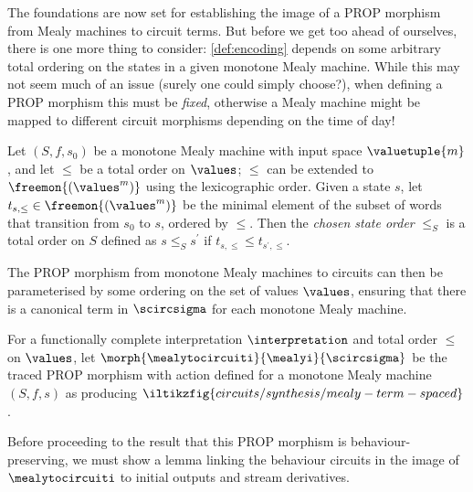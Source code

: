 The foundations are now set for establishing the image of a PROP morphism from
Mealy machines to circuit terms.
But before we get too ahead of ourselves, there is one more thing to consider:
\cref{def:encoding} depends on some arbitrary total ordering on the states in a
given monotone Mealy machine.
While this may not seem much of an issue (surely one could simply choose?), when
defining a PROP morphism this must be \emph{fixed}, otherwise a Mealy machine
might be mapped to different circuit morphisms depending on the time of day!

\begin{definition}
    Let \((S, f, s_0)\) be a monotone Mealy machine with input space
    \(\valuetuple{m}\), and let \(\leq\) be a total order on \(\values\);
    \(\leq\) can be extended to \(\freemon{(\values^m)}\) using the
    lexicographic order.
    Given a state \(s\), let \(t_{s,\leq} \in \freemon{(\values^m)}\) be
    the minimal element of the subset of words that transition from \(s_0\) to
    \(s\), ordered by \(\leq\).
    Then the \emph{chosen state order} \(\leq_S\) is a total order on \(S\)
    defined as \(s \leq_S s^\prime\) if \(t_{s,\leq} \leq t_{s^\prime,\leq}\).
\end{definition}

The PROP morphism from monotone Mealy machines to circuits can then be
parameterised by some ordering on the set of values \(\values\), ensuring that
there is a canonical term in \(\scircsigma\) for each monotone Mealy machine.

\begin{definition}\label{def:mealy-to-circuit}
    For a functionally complete interpretation \(\interpretation\) and total
    order \(\leq\) on \(\values\), let \(
        \morph{
            \mealytocircuiti
        }{
            \mealyi
        }{
            \scircsigma
        }
    \) be the traced PROP morphism with action defined for a monotone Mealy
    machine \((S,f,s)\) as producing \(
        \iltikzfig{circuits/synthesis/mealy-term-spaced}
    \).
\end{definition}

Before proceeding to the result that this PROP morphism is behaviour-preserving,
we must show a lemma linking the behaviour circuits in the image of
\(\mealytocircuiti\) to initial outputs and stream derivatives.

